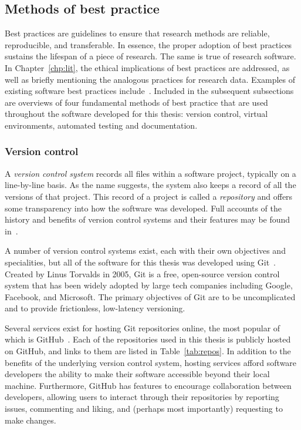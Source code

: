 \subsection{Methods of best practice}

Best practices are guidelines to ensure that research methods are reliable,
reproducible, and transferable. In essence, the proper adoption of best
practices sustains the lifespan of a piece of research. The same is true of
research software. In Chapter~\ref{chp:lit}, the ethical implications of best
practices are addressed, as well as briefly mentioning the analogous practices
for research data. Examples of existing software best practices
include~\cite{Aberdour2007,Benureau2018,Jimenez2017,Wilson2014}. Included in the
subsequent subsections are overviews of four fundamental methods of best
practice that are used throughout the software developed for this thesis:
version control, virtual environments, automated testing and documentation.

\subsubsection{Version control}

A \emph{version control system} records all files within a software project,
typically on a line-by-line basis. As the name suggests, the system also keeps a
record of all the versions of that project. This record of a project is called a
\emph{repository} and offers some transparency into how the software was
developed. Full accounts of the history and benefits of version control systems
and their features may be found in~\cite{Ruparelia2010,Zolkifli2018}.

A number of version control systems exist, each with their own objectives and
specialities, but all of the software for this thesis was developed using
Git~\cite{git}. Created by Linus Torvalds in 2005, Git is a free, open-source
version control system that has been widely adopted by large tech companies
including Google, Facebook, and Microsoft. The primary objectives of Git are to
be uncomplicated and to provide frictionless, low-latency versioning.

Several services exist for hosting Git repositories online, the most popular of
which is GitHub~\cite{github}. Each of the repositories used in this thesis is
publicly hosted on GitHub, and links to them are listed in
Table~\ref{tab:repos}. In addition to the benefits of the underlying version
control system, hosting services afford software developers the ability to make
their software accessible beyond their local machine. Furthermore, GitHub has
features to encourage collaboration between developers, allowing users to
interact through their repositories by reporting issues, commenting and
liking, and (perhaps most importantly) requesting to make changes.

